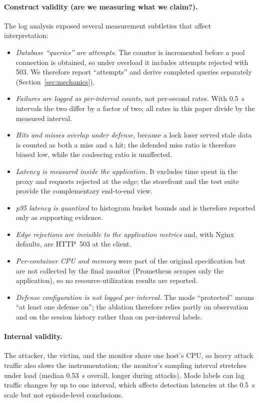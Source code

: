 \documentclass[preprint,12pt]{elsarticle}
\begin{document}
\paragraph{Construct validity (are we measuring what we claim?).} The log analysis
exposed several measurement subtleties that affect interpretation:
\begin{itemize}[leftmargin=*]
\item \emph{Database ``queries'' are attempts.} The counter is incremented before a
pool connection is obtained, so under overload it includes attempts rejected with 503.
We therefore report ``attempts'' and derive completed queries separately
(Section~\ref{sec:mechanics}).
\item \emph{Failures are logged as per-interval counts}, not per-second rates. With
0.5~s intervals the two differ by a factor of two; all rates in this paper divide by
the measured interval.
\item \emph{Hits and misses overlap under defense}, because a lock loser served stale
data is counted as both a miss and a hit; the defended miss ratio is therefore biased
low, while the coalescing ratio is unaffected.
\item \emph{Latency is measured inside the application.} It excludes time spent in the
proxy and requests rejected at the edge; the storefront and the test suite provide the
complementary end-to-end view.
\item \emph{p95 latency is quantized} to histogram bucket bounds and is therefore
reported only as supporting evidence.
\item \emph{Edge rejections are invisible to the application metrics} and, with Nginx
defaults, are HTTP~503 at the client.
\item \emph{Per-container CPU and memory} were part of the original specification but
are not collected by the final monitor (Prometheus scrapes only the application), so
no resource-utilization results are reported.
\item \emph{Defense configuration is not logged per interval.} The mode ``protected''
means ``at least one defense on''; the ablation therefore relies partly on observation
and on the session history rather than on per-interval labels.
\end{itemize}

\paragraph{Internal validity.} The attacker, the victim, and the monitor share one
host's CPU, so heavy attack traffic also slows the instrumentation; the monitor's
sampling interval stretches under load (median 0.53~s overall, longer during attacks).
Mode labels can lag traffic changes by up to one interval, which affects detection
latencies at the 0.5~s scale but not episode-level conclusions.
\end{document}
